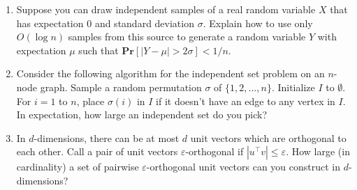 \documentclass[11pt]{article}
\def\eps{\varepsilon}
\def\Pr{\mathbf{Pr}}
\def\Exp{\mathbf{Exp}}
\def\Pr{\mathbf{Pr}}
\def\Exp{\mathbf{Exp}}
\begin{document}
\begin{enumerate}
\item
Suppose you can draw independent samples of a real random variable $X$ that has expectation $0$ and standard deviation $\sigma$. Explain how to use only $O(\log n)$ samples from this source to generate a random variable $Y$ with expectation $\mu$ such that $\Pr[|Y-\mu| > 2 \sigma] < 1/n$. 
\vspace{0.5ex}
\item 
Consider the following algorithm for the independent set problem on an $n$-node graph. Sample a random permutation $\sigma$ of $\{1,2,\ldots,n\}$. Initialize $I$ to $\emptyset$.
For $i=1$ to $n$, place $\sigma(i)$ in $I$ if it doesn't have an edge to any vertex in $I$.  In expectation, how large an independent set do you pick?
\vspace{0.5ex}




\item  In $d$-dimensions, there can be at most $d$ unit vectors which are orthogonal to each other.
Call a pair of unit vectors $\eps$-orthogonal if $|u^\top v|\leq \eps$. How large (in cardinality) a set of pairwise $\eps$-orthogonal unit vectors can you construct in $d$-dimensions?


\end{enumerate}
\end{document}
